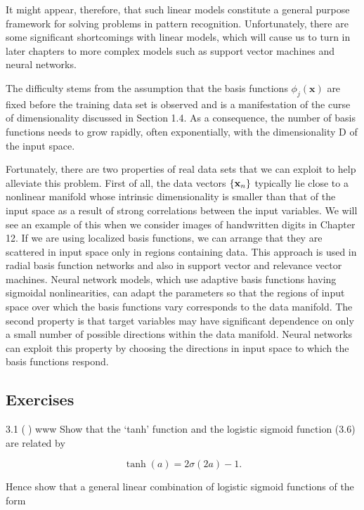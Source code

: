\documentclass[
  10
]{article}
\begin{document}
It might appear, therefore, that such linear models constitute a general
purpose framework for solving problems in pattern recognition.
Unfortunately, there are some significant shortcomings with linear
models, which will cause us to turn in later chapters to more complex
models such as support vector machines and neural networks.

The difficulty stems from the assumption that the basis functions
\(\phi _ { j } ( \mathbf { x } )\) are fixed before the training data
set is observed and is a manifestation of the curse of dimensionality
discussed in Section 1.4. As a consequence, the number of basis
functions needs to grow rapidly, often exponentially, with the
dimensionality D of the input space.

Fortunately, there are two properties of real data sets that we can
exploit to help alleviate this problem. First of all, the data vectors
\(\left\{ { \bf x } _ { n } \right\}\) typically lie close to a
nonlinear manifold whose intrinsic dimensionality is smaller than that
of the input space as a result of strong correlations between the input
variables. We will see an example of this when we consider images of
handwritten digits in Chapter 12. If we are using localized basis
functions, we can arrange that they are scattered in input space only in
regions containing data. This approach is used in radial basis function
networks and also in support vector and relevance vector machines.
Neural network models, which use adaptive basis functions having
sigmoidal nonlinearities, can adapt the parameters so that the regions
of input space over which the basis functions vary corresponds to the
data manifold. The second property is that target variables may have
significant dependence on only a small number of possible directions
within the data manifold. Neural networks can exploit this property by
choosing the directions in input space to which the basis functions
respond.

\subsection{Exercises}\label{exercises-3}

3.1 () www Show that the `tanh' function and the logistic sigmoid
function (3.6) are related by

\[
\tanh (a) = 2 \sigma (2 a) - 1.\tag{3.100}
\]

Hence show that a general linear combination of logistic sigmoid
functions of the form
\end{document}
